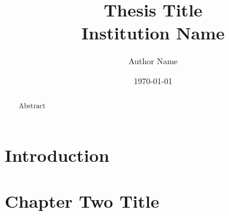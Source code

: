\documentclass[12pt]{report}
\title{
	{Thesis Title}\\
	{\large Institution Name}\\
}
\author{Author Name}
\date{\today}
\begin{document}
\begin{abstract}
Abstract
\end{abstract}
\tableofcontents
\listoffigures
\listoftables



\chapter{Introduction}


\chapter{Chapter Two Title}

\end{document}
